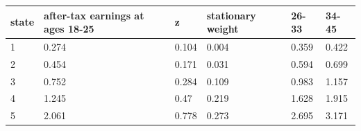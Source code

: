 \begingroup\small
\setlength{\tabcolsep}{3pt}
\renewcommand{\arraystretch}{1.04}
\begin{tabularx}{\linewidth}{XXXXXX}
\toprule
state & after-tax earnings at ages 18-25 & z & stationary weight & 26-33 & 34-45 \\
\midrule
1 & 0.274 & 0.104 & 0.004 & 0.359 & 0.422 \\
2 & 0.454 & 0.171 & 0.031 & 0.594 & 0.699 \\
3 & 0.752 & 0.284 & 0.109 & 0.983 & 1.157 \\
4 & 1.245 & 0.47 & 0.219 & 1.628 & 1.915 \\
5 & 2.061 & 0.778 & 0.273 & 2.695 & 3.171 \\
\bottomrule
\end{tabularx}
\endgroup
